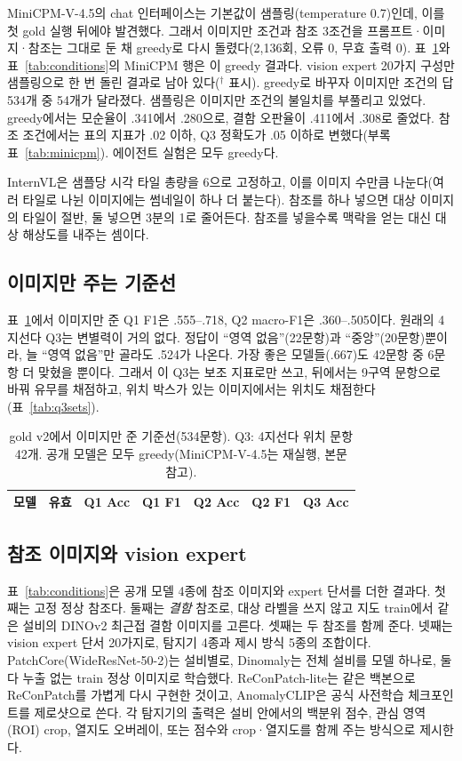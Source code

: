 \documentclass[11pt]{article}
\begin{document}
MiniCPM-V-4.5의 chat 인터페이스는 기본값이 샘플링(temperature 0.7)인데, 이를 첫 gold 실행 뒤에야 발견했다. 그래서 이미지만 조건과 참조 3조건을 프롬프트·이미지·참조는 그대로 둔 채 greedy로 다시 돌렸다(2,136회, 오류 0, 무효 출력 0). 표~\ref{tab:baseline}와 표~\ref{tab:conditions}의 MiniCPM 행은 이 greedy 결과다. vision expert 20가지 구성만 샘플링으로 한 번 돌린 결과로 남아 있다($^\dagger$ 표시). greedy로 바꾸자 이미지만 조건의 답 534개 중 54개가 달라졌다. 샘플링은 이미지만 조건의 불일치를 부풀리고 있었다. greedy에서는 모순율이 .341에서 .280으로, 결함 오판율이 .411에서 .308로 줄었다. 참조 조건에서는 표의 지표가 .02 이하, Q3 정확도가 .05 이하로 변했다(부록 표~\ref{tab:minicpm}). 에이전트 실험은 모두 greedy다.

InternVL은 샘플당 시각 타일 총량을 6으로 고정하고, 이를 이미지 수만큼 나눈다(여러 타일로 나뉜 이미지에는 썸네일이 하나 더 붙는다). 참조를 하나 넣으면 대상 이미지의 타일이 절반, 둘 넣으면 3분의 1로 줄어든다. 참조를 넣을수록 맥락을 얻는 대신 대상 해상도를 내주는 셈이다.

\subsection{이미지만 주는 기준선}
표~\ref{tab:baseline}에서 이미지만 준 Q1 F1은 .555--.718, Q2 macro-F1은 .360--.505이다. 원래의 4지선다 Q3는 변별력이 거의 없다. 정답이 ``영역 없음''(22문항)과 ``중앙''(20문항)뿐이라, 늘 ``영역 없음''만 골라도 .524가 나온다. 가장 좋은 모델들(.667)도 42문항 중 6문항 더 맞혔을 뿐이다. 그래서 이 Q3는 보조 지표로만 쓰고, 뒤에서는 9구역 문항으로 바꿔 유무를 채점하고, 위치 박스가 있는 이미지에서는 위치도 채점한다(표~\ref{tab:q3sets}).

\begin{table}[t]
\centering
\caption{gold v2에서 이미지만 준 기준선(534문항). Q3: 4지선다 위치 문항 42개. 공개 모델은 모두 greedy(MiniCPM-V-4.5는 재실행, 본문 참고).}
\label{tab:baseline}
\begin{tabular}{lrrrrrr}
\toprule
모델 & 유효 & Q1 Acc & Q1 F1 & Q2 Acc & Q2 F1 & Q3 Acc \\
\midrule

\bottomrule
\end{tabular}
\end{table}

\subsection{참조 이미지와 vision expert}
표~\ref{tab:conditions}은 공개 모델 4종에 참조 이미지와 expert 단서를 더한 결과다. 첫째는 고정 정상 참조다. 둘째는 \emph{결함} 참조로, 대상 라벨을 쓰지 않고 지도 train에서 같은 설비의 DINOv2 최근접 결함 이미지를 고른다. 셋째는 두 참조를 함께 준다. 넷째는 vision expert 단서 20가지로, 탐지기 4종과 제시 방식 5종의 조합이다. PatchCore(WideResNet-50-2)는 설비별로, Dinomaly는 전체 설비를 모델 하나로, 둘 다 누출 없는 train 정상 이미지로 학습했다. ReConPatch-lite는 같은 백본으로 ReConPatch를 가볍게 다시 구현한 것이고, AnomalyCLIP은 공식 사전학습 체크포인트를 제로샷으로 쓴다. 각 탐지기의 출력은 설비 안에서의 백분위 점수, 관심 영역(ROI) crop, 열지도 오버레이, 또는 점수와 crop·열지도를 함께 주는 방식으로 제시한다.
\end{document}
